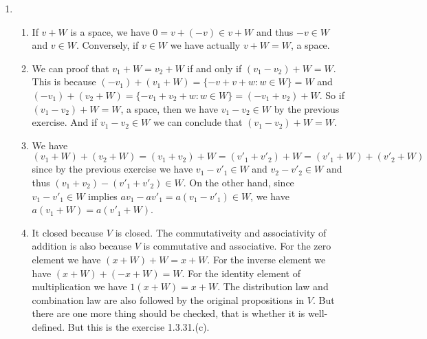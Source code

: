 \begin{enumerate}
\item 
\begin{enumerate}
\item If $v+W$ is a space, we have $0=v+(-v)\in v+W$ and thus $-v\in W$ and $v\in W$. Conversely, if $v\in W$ we have actually $v+W=W$, a space. 
\item We can proof that $v_1+W=v_2+W$ if and only if $(v_1-v_2)+W=W$. This is because $(-v_1)+(v_1+W)=\{-v+v+w:w\in W\}=W$ and $(-v_1)+(v_2+W)=\{-v_1+v_2+w:w\in W\}=(-v_1+v_2)+W$. So if $(v_1-v_2)+W=W$, a space, then we have $v_1-v_2\in W$ by the previous exercise. And if $v_1-v_2\in W$ we can conclude that $(v_1-v_2)+W=W$.
\item We have $(v_1+W)+(v_2+W)=(v_1+v_2)+W=(v'_1+v'_2)+W=(v'_1+W)+(v'_2+W)$ since by the previous exercise we have $v_1-v'_1\in W$ and $v_2-v'_2\in W$ and thus $(v_1+v_2)-(v'_1+v'_2)\in W$. On the other hand, since $v_1-v'_1\in W$ implies $av_1-av'_1=a(v_1-v'_1)\in W$, we have $a(v_1+W)=a(v'_1+W)$.
\item It closed because $V$ is closed. The commutativeity and associativity of addition is also because $V$ is commutative and associative. For the zero element we have $(x+W)+W=x+W$. For the inverse element we have $(x+W)+(-x+W)=W$. For the identity element of multiplication we have $1(x+W)=x+W$. The distribution law and combination law are also followed by the original propositions in $V$. But there are one more thing should be checked, that is whether it is well-defined. But this is the exercise 1.3.31.(c).
\end{enumerate}
\end{enumerate}
